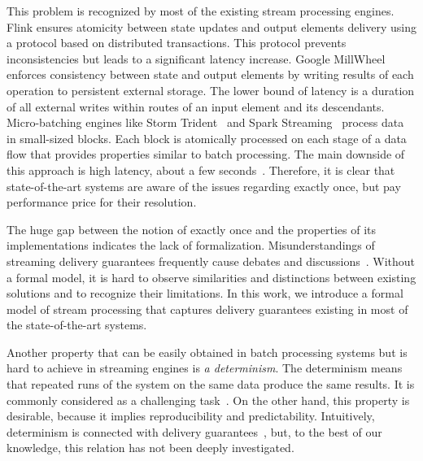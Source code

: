 This problem is recognized by most of the existing stream processing engines. Flink ensures atomicity between state updates and output elements delivery using a protocol based on distributed transactions. This protocol prevents inconsistencies but leads to a significant latency increase. Google MillWheel~\cite{Akidau:2013:MFS:2536222.2536229} enforces consistency between state and output elements by writing results of each operation to persistent external storage. The lower bound of latency is a duration of all external writes within routes of an input element and its descendants. Micro-batching engines like Storm Trident~\cite{apache:storm:trident} and Spark Streaming~\cite{Zaharia:2012:DSE:2342763.2342773} process data in small-sized blocks. Each block is atomically processed on each stage of a data flow that provides properties similar to batch processing. The main downside of this approach is high latency, about a few seconds~\cite{7530084, 7474816}. Therefore, it is clear that state-of-the-art systems are aware of the issues regarding exactly once, but pay performance price for their resolution.

The huge gap between the notion of exactly once and the properties of its implementations indicates the lack of formalization. Misunderstandings of streaming delivery guarantees frequently cause debates and discussions~\cite{JerryPengStreamIO, PaperTrail}. Without a formal model, it is hard to observe similarities and distinctions between existing solutions and to recognize their limitations. In this work, we introduce a formal model of stream processing that captures delivery guarantees existing in most of the state-of-the-art systems.

Another property that can be easily obtained in batch processing systems but is hard to achieve in streaming engines is {\em a determinism}. The determinism means that repeated runs of the system on the same data produce the same results. It is commonly considered as a challenging task~\cite{Zacheilas:2017:MDS:3093742.3093921}. On the other hand, this property is desirable, because it implies reproducibility and predictability. Intuitively, determinism is connected with delivery guarantees~\cite{Stonebraker:2005:RRS:1107499.1107504}, but, to the best of our knowledge, this relation has not been deeply investigated. 


